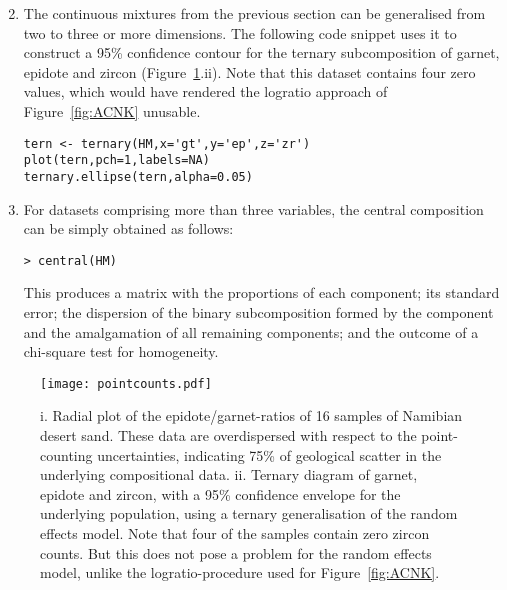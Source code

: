 \documentclass[11pt]{article}
\begin{document}
\begin{enumerate}
\setcounter{enumi}{1}
\item The continuous mixtures from the previous section can be
  generalised from two to three or more dimensions. The following code
  snippet uses it to construct a 95\% confidence contour for the
  ternary subcomposition of garnet, epidote and zircon
  (Figure~\ref{fig:radial}.ii).  Note that this dataset contains four
  zero values, which would have rendered the logratio approach of
  Figure~\ref{fig:ACNK} unusable.

\begin{verbatim}
tern <- ternary(HM,x='gt',y='ep',z='zr')
plot(tern,pch=1,labels=NA)
ternary.ellipse(tern,alpha=0.05)
\end{verbatim}

\item For datasets comprising more than three variables, the central
  composition can be simply obtained as follows:

\begin{verbatim}
> central(HM)
\end{verbatim}
  
This produces a matrix with the proportions of each component; its
standard error; the dispersion of the binary subcomposition formed by
the component and the amalgamation of all remaining components; and
the outcome of a chi-square test for homogeneity.

\end{enumerate}

\begin{figure}[!ht]
  \centering
  \texttt{[image: pointcounts.pdf]}
  \caption{i. Radial plot of the epidote/garnet-ratios of 16 samples
    of Namibian desert sand. These data are overdispersed with respect
    to the point-counting uncertainties, indicating 75\% of geological
    scatter in the underlying compositional data. ii. Ternary diagram
    of garnet, epidote and zircon, with a 95\% confidence envelope for
    the underlying population, using a ternary generalisation of the
    random effects model. Note that four of the samples contain zero
    zircon counts. But this does not pose a problem for the random
    effects model, unlike the logratio-procedure used for
    Figure~\ref{fig:ACNK}.}
  \label{fig:radial}
\end{figure}
\end{document}
